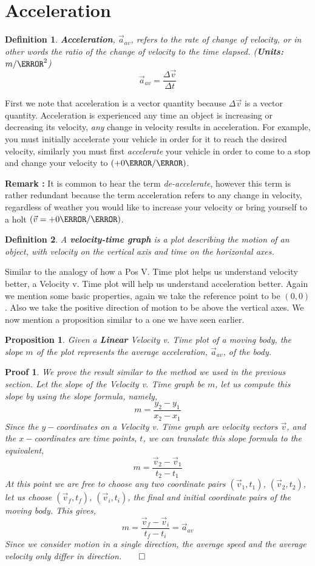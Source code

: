 \documentclass[12pt]{article}
\theoremstyle{break}
\newtheorem*{pf}{Proof}
\newtheorem{defn}{Definition}[subsection]
\newtheorem{prop}[thm]{Proposition}
\begin{document}
\let\ref\Cref
\section{Acceleration}
\begin{defn}
\textbf{Acceleration}, $\vec a_{av}$, refers to the rate of change of velocity, or in other words the ratio of the change of velocity to the time elapsed. (\textbf{Units:} $m / \s^2$)
$$\vec a_{av} = \frac{\Delta \vec v}{\Delta t}$$
\end{defn}
First we note that acceleration is a vector quantity because $\Delta \vec v$ is a vector quantity. Acceleration is experienced any time an object is increasing or decreasing its velocity, \emph{any} change in velocity results in acceleration. For example, you must initially accelerate your vehicle in order for it to reach the desired velocity, similarly you must first \emph{accelerate} your vehicle in order to come to a stop and change your velocity to $(+0\m / \s)$.  

\textbf{Remark :} It is common to hear the term \emph{de-accelerate}, however this term is rather redundant because the term acceleration refers to any change in velocity, regardless of weather you would like to increase your velocity or bring yourself to a holt $(\vec v = +0\m / \s)$. 

\begin{defn}
A \textbf{velocity-time graph} is a plot describing the motion of an object, with velocity on the vertical axis and time on the horizontal axes.
\end{defn}
Similar to the analogy of how a Pos V. Time plot helps us understand velocity better, a Velocity v. Time plot will help us understand acceleration better. Again we mention some basic properties, again we take the reference point to be $(0,0)$. Also we take the positive direction of motion to be above the vertical axes. We now mention a proposition similar to a one we have seen earlier.
\begin{prop}
Given a \textbf{Linear} Velocity v. Time plot of a moving body, the slope $m$ of the plot represents the average acceleration, $\vec a_{av}$, of the body.
\end{prop}
\begin{pf}
We prove the result similar to the method we used in the previous section. Let the slope of the Velocity v. Time graph be $m$, let us compute this slope by using the slope formula, namely,
$$m = \frac{y_2 - y_1}{x_2 - x_1}$$
Since the $y-$coordinates on a Velocity v. Time graph are velocity vectors $\vec v$, and the $x-$coordinates are time points, $t$, we can translate this slope formula to the equivalent,
$$m = \frac{\vec v_2 - \vec v_1}{t_2 - t_1}$$
At this point we are free to choose any two coordinate pairs $(\vec v_1,t_1)$, $(\vec v_2, t_2)$, let us choose $(\vec v_f, t_f)$, $(\vec v_i, t_i)$, the final and initial coordinate pairs of the moving body. This gives,
$$m = \frac{\vec v_f - \vec v_i}{t_f - t_i} = \vec a_{av}$$ 
Since we consider motion in a single direction, the average speed and the average velocity only differ in direction.$\qed$
\end{pf}
\end{document}
